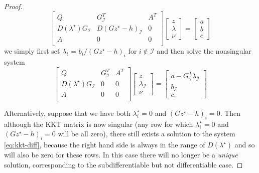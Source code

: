 \begin{proof}
\begin{equation}
\begin{bmatrix}
            Q                               & G_{\mathcal{I}}^T           & A^T \\
            D(\lambda^\star)G_{\mathcal{I}} & D(Gz^\star-h)_{\mathcal{I}} & 0   \\
            A                               & 0                           & 0   \\
        \end{bmatrix}
        \begin{bmatrix}
            z \\ \lambda \\ \nu
        \end{bmatrix} =
        \begin{bmatrix}
            a \\ b \\ c
        \end{bmatrix}
    \end{equation}
    we simply first set $\lambda_i$ = $b_i / (Gz^\star - h)_i$ for
    $i \not \in \mathcal{I}$ and then solve the nonsingular system
    \begin{equation}
        \begin{bmatrix}
            Q                               & G_{\mathcal{I}}^T & A^T \\
            D(\lambda^\star)G_{\mathcal{I}} & 0                 & 0   \\
            A                               & 0                 & 0   \\
        \end{bmatrix}
        \begin{bmatrix}
            z \\ \lambda_\mathcal{I} \\ \nu
        \end{bmatrix} =
        \begin{bmatrix}
            a - G^T_{\bar{\mathcal{I}}} \lambda_{\bar{\mathcal{I}}} \\ b_\mathcal{I} \\ c.
        \end{bmatrix}
    \end{equation}

    Alternatively, suppose that we have both $\lambda^\star_i = 0$ and $(Gz^\star
        - h)_i = 0$.  Then although the KKT matrix is now singular (any row for which
    $\lambda^\star_i = 0$ and $(Gz^\star -  h)_i = 0$ will be all zero), there
    still exists a solution to the system \eqref{eq:kkt-diff}, because the right
    hand side is always in the range of $D(\lambda^\star)$ and so will also be
    zero for these rows.  In this case there will no longer be a \emph{unique}
    solution, corresponding to the subdifferentiable but not differentiable case.
\end{proof}


